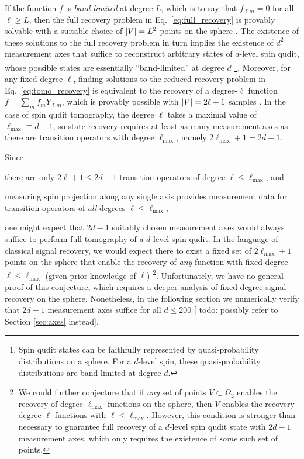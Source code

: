 \documentclass[notitlepage,twocolumn]{revtex4-2}
\renewcommand{\t}{\text} %
\newcommand{\1}{\mathds{1}}
\newcommand{\red}[1]{{\color{red} #1}}
\begin{document}
If the function $f$ is {\it band-limited} at degree $L$, which is to say that $f_{\ell m}=0$ for all $\ell\ge L$, then the full recovery problem in Eq.~\eqref{eq:full_recovery} is provably solvable with a suitable choice of $\abs{V}=L^2$ points on the sphere \cite{freeden2008spherical, freeden2018spherical}.
The existence of these solutions to the full recovery problem in turn implies the existence of $d^2$ measurement axes that suffice to reconstruct arbitrary states of $d$-level spin qudit, whose possible states are essentially ``band-limited'' at degree $d$ \footnote{Spin qudit states can be faithfully represented by quasi-probability distributions on a sphere.  For a $d$-level spin, these quasi-probability distributions are band-limited at degree $d$.}.
Moreover, for any fixed degree $\ell$, finding solutions to the reduced recovery problem in Eq.~\eqref{eq:tomo_recovery} is equivalent to the recovery of a degree-$\ell$ function $f = \sum_m f_m Y_{\ell m}$, which is provably possible with $\abs{V}=2\ell+1$ samples \cite{freeden2008spherical}.
In the case of spin qudit tomography, the degree $\ell$ takes a maximal value of $\ell_{\t{max}}\equiv d-1$, so state recovery requires at least as many measurement axes as there are transition operators with degree $\ell_{\t{max}}$, namely $2\ell_{\t{max}}+1=2d-1$.

Since
\begin{enumerate*}
\item there are only $2\ell+1\le2d-1$ transition operators of degree $\ell\le\ell_{\t{max}}$, and
\item measuring spin projection along any single axis provides measurement data for transition operators of {\it all} degrees $\ell\le\ell_{\t{max}}$,
\end{enumerate*}
one might expect that $2d-1$ suitably chosen measurement axes would always suffice to perform full tomography of a $d$-level spin qudit.
In the language of classical signal recovery, we would expect there to exist a fixed set of $2\ell_{\t{max}}+1$ points on the sphere that enable the recovery of {\it any} function with fixed degree $\ell\le\ell_{\t{max}}$ (given prior knowledge of $\ell$) \footnote{We could further conjecture that if {\it any} set of points $V\subset\Omega_2$ enables the recovery of degree-$\ell_{\t{max}}$ functions on the sphere, then $V$ enables the recovery degree-$\ell$ functions with $\ell\le\ell_{\t{max}}$.  However, this condition is stronger than necessary to guarantee full recovery of a $d$-level spin qudit state with $2d-1$ measurement axes, which only requires the existence of {\it some} such set of points.}.
Unfortunately, we have no general proof of this conjecture, which requires a deeper analysis of fixed-degree signal recovery on the sphere.
Nonetheless, in the following section we numerically verify that $2d-1$ measurement axes suffice for all $d\le200$ [\red{todo: possibly refer to Section \ref{sec:axes} instead}].
\end{document}
